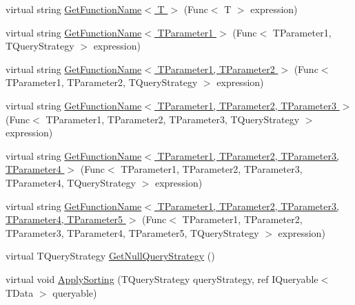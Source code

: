 \begin{DoxyCompactItemize}
\item 
virtual string \hyperlink{classCqrs_1_1Repositories_1_1Queries_1_1QueryBuilder_a2fce57b724f5443ea75e2f17ae07d401}{Get\+Function\+Name$<$ T $>$} (Func$<$ T $>$ expression)
\item 
virtual string \hyperlink{classCqrs_1_1Repositories_1_1Queries_1_1QueryBuilder_ace3bdd5bf69a3d56f2e1ec19e75bf2cf}{Get\+Function\+Name$<$ T\+Parameter1 $>$} (Func$<$ T\+Parameter1, T\+Query\+Strategy $>$ expression)
\item 
virtual string \hyperlink{classCqrs_1_1Repositories_1_1Queries_1_1QueryBuilder_a45c4e9123301de6f5b3cdd41c79e86ab}{Get\+Function\+Name$<$ T\+Parameter1, T\+Parameter2 $>$} (Func$<$ T\+Parameter1, T\+Parameter2, T\+Query\+Strategy $>$ expression)
\item 
virtual string \hyperlink{classCqrs_1_1Repositories_1_1Queries_1_1QueryBuilder_a8fbbbe8bd1f48413c862668799987dec}{Get\+Function\+Name$<$ T\+Parameter1, T\+Parameter2, T\+Parameter3 $>$} (Func$<$ T\+Parameter1, T\+Parameter2, T\+Parameter3, T\+Query\+Strategy $>$ expression)
\item 
virtual string \hyperlink{classCqrs_1_1Repositories_1_1Queries_1_1QueryBuilder_aebcd9642f5cab863707bcfc2b4ad8b54}{Get\+Function\+Name$<$ T\+Parameter1, T\+Parameter2, T\+Parameter3, T\+Parameter4 $>$} (Func$<$ T\+Parameter1, T\+Parameter2, T\+Parameter3, T\+Parameter4, T\+Query\+Strategy $>$ expression)
\item 
virtual string \hyperlink{classCqrs_1_1Repositories_1_1Queries_1_1QueryBuilder_a0228422245afb7fe388114236bb1aefa}{Get\+Function\+Name$<$ T\+Parameter1, T\+Parameter2, T\+Parameter3, T\+Parameter4, T\+Parameter5 $>$} (Func$<$ T\+Parameter1, T\+Parameter2, T\+Parameter3, T\+Parameter4, T\+Parameter5, T\+Query\+Strategy $>$ expression)
\item 
virtual T\+Query\+Strategy \hyperlink{classCqrs_1_1Repositories_1_1Queries_1_1QueryBuilder_a57b32d33321cbacfc7e58fec6ba3887c}{Get\+Null\+Query\+Strategy} ()
\item 
virtual void \hyperlink{classCqrs_1_1Repositories_1_1Queries_1_1QueryBuilder_aea4b78b2633babfaea0862f2a365c7d3}{Apply\+Sorting} (T\+Query\+Strategy query\+Strategy, ref I\+Queryable$<$ T\+Data $>$ queryable)
\end{DoxyCompactItemize}
